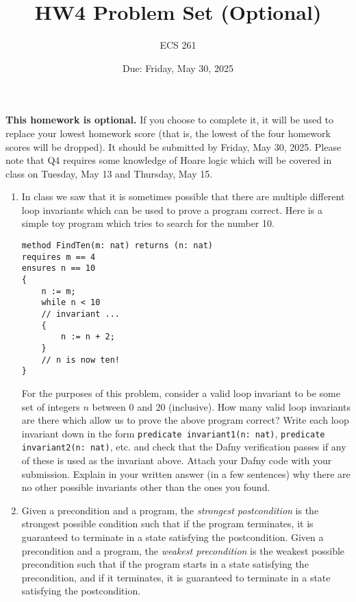 \documentclass{article}
\begin{document}
\title{HW4 Problem Set (Optional)}
\author{ECS 261}
\date{Due: Friday, May 30, 2025}

\maketitle

\noindent
\textbf{This homework is optional.}
If you choose to complete it, it will be used to replace your lowest homework score (that is, the lowest of the four homework scores will be dropped).
It should be submitted by Friday, May 30, 2025.
Please note that Q4 requires some knowledge of Hoare logic which will be covered in class on Tuesday, May 13 and Thursday, May 15.

\noindent\hrulefill

\begin{enumerate}

\item
In class we saw that it is sometimes possible that there are multiple different loop invariants
which can be used to prove a program correct.
Here is a simple toy program which tries to search for the number 10.
\begin{verbatim}
method FindTen(m: nat) returns (n: nat)
requires m == 4
ensures n == 10
{
    n := m;
    while n < 10
    // invariant ...
    {
        n := n + 2;
    }
    // n is now ten!
}
\end{verbatim}

For the purposes of this problem, consider a valid loop invariant to be some set of integers
$n$ between 0 and 20 (inclusive).
How many valid loop invariants are there which allow us to prove the above program correct?
Write each loop invariant down in the form \texttt{predicate invariant1(n: nat)}, \texttt{predicate invariant2(n: nat)}, etc. and check that the Dafny verification passes if any of these
is used as the invariant above.
Attach your Dafny code with your submission.
Explain in your written answer (in a few sentences) why there are no other possible invariants other than the ones you found.

\item
Given a precondition and a program, the \emph{strongest postcondition} is the strongest possible condition such that if the program terminates, it is guaranteed to terminate in a state satisfying the postcondition.
Given a precondition and a program, the \emph{weakest precondition} is the weakest possible precondition such that if the program starts in a state satisfying the precondition, and if it terminates, it is guaranteed to terminate in a state satisfying the postcondition.


\end{enumerate}
\end{document}
